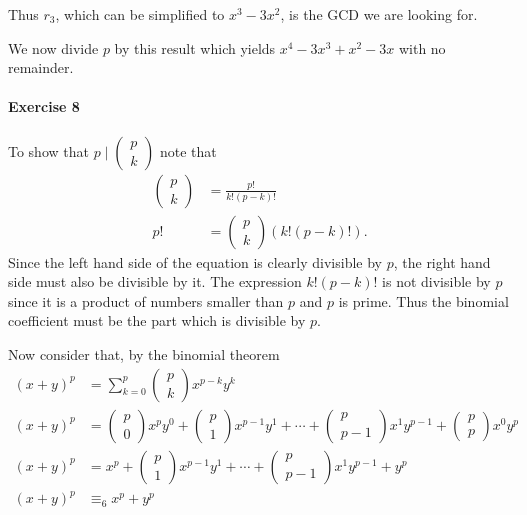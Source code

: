 \documentclass{article}
\begin{document}
Thus $r_3$, which can be simplified to $x^3 - 3x^2$, is the GCD we are looking for.

We now divide $p$ by this result which yields $x^4-3 x^3+x^2-3 x$ with no remainder.

\pagebreak
\paragraph{Exercise 8}

To show that $p \mid \left(\begin{smallmatrix}
    p \\k
\end{smallmatrix}\right)$ note that
\begin{align*}
    \begin{pmatrix*}
        p \\k
    \end{pmatrix*} &= \frac{p!}{k!(p - k)!} \\
    p! &= \begin{pmatrix*}
        p \\k
    \end{pmatrix*}(k!(p - k)!).
\end{align*}
Since the left hand side of the equation is clearly divisible by $p$, the right hand side must also be divisible by it. The expression $k!(p - k)!$ is not divisible by $p$ since it is a product of numbers smaller than $p$ and $p$ is prime. Thus the binomial coefficient must be the part which is divisible by $p$.

Now consider that, by the binomial theorem
\begin{align*}
    (x + y)^p &= \sum^{p}_{k = 0} \begin{pmatrix*}
        p \\k
    \end{pmatrix*}x^{p - k}y^{k} \\
    (x + y)^p &= \begin{pmatrix*}
        p \\0
    \end{pmatrix*}x^p y^0 + 
    \begin{pmatrix*}
        p \\1
    \end{pmatrix*}x^{p-1} y^1 + \cdots +
    \begin{pmatrix*}
        p \\p - 1
    \end{pmatrix*}
    x^1 y^{p - 1} + 
    \begin{pmatrix*}
        p \\p
    \end{pmatrix*}
    x^0 y^p \\
    (x + y)^p &= x^p + \begin{pmatrix*}
        p \\1
    \end{pmatrix*}x^{p-1} y^1 + \cdots +
    \begin{pmatrix*}
        p \\p - 1
    \end{pmatrix*}
    x^1 y^{p - 1} + y^p \\
    (x + y)^p &\equiv_6 x^p + y^p
\end{align*}
\end{document}
